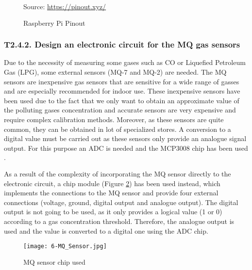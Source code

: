 \begin{figure}[htb]
	\centering
	\caption{Raspberry Pi Pinout}
	\label{fig:6-Raspberry-Pinout}{Source: \url{https://pinout.xyz/}}
\end{figure}

\subsubsection{T2.4.2. Design an electronic circuit for the MQ gas sensors}
Due to the necessity of measuring some gases such as CO or Liquefied Petroleum Gas (LPG), some external sensors (MQ-7 and MQ-2) are needed. The MQ sensors are inexpensive gas sensors that are sensitive for a wide range of gasses and are especially recommended for indoor use. These inexpensive sensors have been used due to the fact that we only want to obtain an approximate value of the polluting gases concentration and accurate sensors are very expensive and require complex calibration methods. Moreover, as these sensors are quite common, they can be obtained in lot of specialized stores. A conversion to a digital value must be carried out as these sensors only provide an analogue signal output. For this purpose an \ac{ADC} is needed and the MCP3008 chip has been used \cite{MCP3008}.

As a result of the complexity of incorporating the MQ sensor directly to the electronic circuit, a chip module (Figure \ref{fig:6-MQ_Sensor}) has been used instead, which implements the connections to the MQ sensor and provide four external connections (voltage, ground, digital output and analogue output). The digital output is not going to be used, as it only provides a logical value (1 or 0) according to a gas concentration threshold. Therefore, the analogue output is used and the value is converted to a digital one using the \ac{ADC} chip.

\begin{figure}[!h]
	\begin{center}
		\texttt{[image: 6-MQ\_Sensor.jpg]}
		\caption{MQ sensor chip used}
		\label{fig:6-MQ_Sensor}
	\end{center}
\end{figure}

